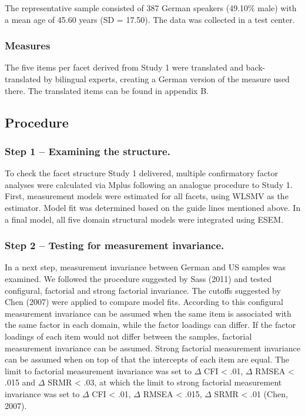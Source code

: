 \documentclass[,man,floatsintext]{apa6}
\theoremstyle{definition}
\theoremstyle{definition}
\theoremstyle{definition}
\theoremstyle{remark}
\begin{document}
The representative sample consisted of 387 German speakers (49.10\%
male) with a mean age of 45.60 years (SD = 17.50). The data was
collected in a test center.

\hypertarget{measures-1}{%
\subsubsection{Measures}\label{measures-1}}

The five items per facet derived from Study 1 were translated and
back-translated by bilingual experts, creating a German version of the
measure used there. The translated items can be found in appendix B.

\hypertarget{procedure-1}{%
\subsection{Procedure}\label{procedure-1}}

\hypertarget{step-1-examining-the-structure.}{%
\subsubsection{Step 1 -- Examining the
structure.}\label{step-1-examining-the-structure.}}

To check the facet structure Study 1 delivered, multiple confirmatory
factor analyses were calculated via Mplus following an analogue
procedure to Study 1. First, measurement models were estimated for all
facets, using WLSMV as the estimator. Model fit was determined based on
the guide lines mentioned above. In a final model, all five domain
structural models were integrated using ESEM.

\hypertarget{step-2-testing-for-measurement-invariance.}{%
\subsubsection{Step 2 -- Testing for measurement
invariance.}\label{step-2-testing-for-measurement-invariance.}}

In a next step, measurement invariance between German and US samples was
examined. We followed the procedure suggested by Sass (2011) and tested
configural, factorial and strong factorial invariance. The cutoffs
suggested by Chen (2007) were applied to compare model fits. According
to this configural measurement invariance can be assumed when the same
item is associated with the same factor in each domain, while the factor
loadings can differ. If the factor loadings of each item would not
differ between the samples, factorial measurement invariance can be
assumed. Strong factorial measurement invariance can be assumed when on
top of that the intercepts of each item are equal. The limit to
factorial measurement invariance was set to \(\Delta\) CFI \textless{}
.01, \(\Delta\) RMSEA \textless{} .015 and \(\Delta\) SRMR \textless{}
.03, at which the limit to strong factorial measurement invariance was
set to \(\Delta\) CFI \textless{} .01, \(\Delta\) RMSEA \textless{}
.015, \(\Delta\) SRMR \textless{} .01 (Chen, 2007).
\end{document}
